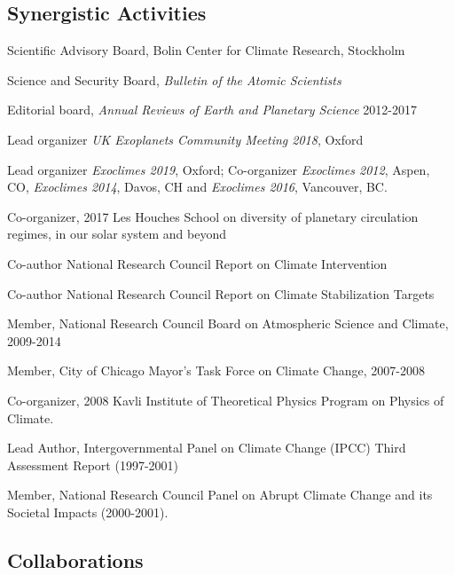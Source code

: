 \documentclass[11pt]{article}
\begin{document}
\subsection{Synergistic Activities}

\begin{bibenum}[itemsep=4pt]

\item Scientific Advisory Board, Bolin Center for Climate Research, Stockholm
\item Science and Security Board, {\it Bulletin of the Atomic Scientists}
\item Editorial board, {\it Annual Reviews of Earth and Planetary Science} 2012-2017
\item Lead organizer {\it UK Exoplanets Community Meeting 2018}, Oxford
\item Lead organizer {\it Exoclimes 2019}, Oxford; Co-organizer {\it Exoclimes 2012}, Aspen, CO, {\it Exoclimes 2014}, Davos, CH
      and {\it Exoclimes 2016}, Vancouver, BC.
\item Co-organizer, 2017 Les Houches School on diversity of planetary circulation regimes, in our solar system and beyond 
\item Co-author National Research Council Report on Climate Intervention
\item Co-author National Research Council Report on Climate Stabilization Targets
\item Member, National Research Council Board on Atmospheric Science and Climate, 
       2009-2014
\item Member, City of Chicago Mayor's Task Force on Climate Change, 2007-2008 
\item Co-organizer, 2008 Kavli Institute of Theoretical Physics Program on Physics
  of Climate.
\item Lead Author, Intergovernmental Panel on Climate Change (IPCC) 
Third Assessment Report (1997-2001)
\item Member, National Research Council Panel on Abrupt Climate Change and its Societal Impacts
(2000-2001).


\end{bibenum}

\subsection{Collaborations}
\end{document}
